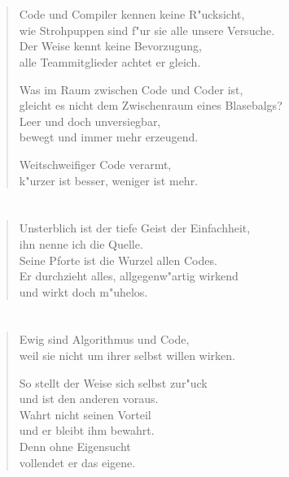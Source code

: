 \documentclass[a4paper,10pt,openany]{book}
\begin{document}
\chapter{}
\begin{verse}
Code und Compiler kennen keine R"ucksicht,\\
wie Strohpuppen sind f"ur sie alle unsere Versuche.\\
Der Weise kennt keine Bevorzugung,\\
alle Teammitglieder achtet er gleich.

Was im Raum zwischen Code und Coder ist,\\
gleicht es nicht dem Zwischenraum eines Blasebalgs?\\
Leer und doch unversiegbar,\\
bewegt und immer mehr erzeugend.

Weitschweifiger Code verarmt,\\
k"urzer ist besser, weniger ist mehr.
\end{verse}

\chapter{}
\begin{verse}
Unsterblich ist der tiefe Geist der Einfachheit,\\
ihn nenne ich die Quelle.\\
Seine Pforte ist die Wurzel allen Codes.\\
Er durchzieht alles, allgegenw"artig wirkend\\
und wirkt doch m"uhelos.
\end{verse}

\chapter{}
\begin{verse}
Ewig sind Algorithmus und Code,\\
weil sie nicht um ihrer selbst willen wirken.

So stellt der Weise sich selbst zur"uck\\
und ist den anderen voraus.\\
Wahrt nicht seinen Vorteil\\
und er bleibt ihm bewahrt.\\
Denn ohne Eigensucht\\
vollendet er das eigene.
\end{verse}
\end{document}
